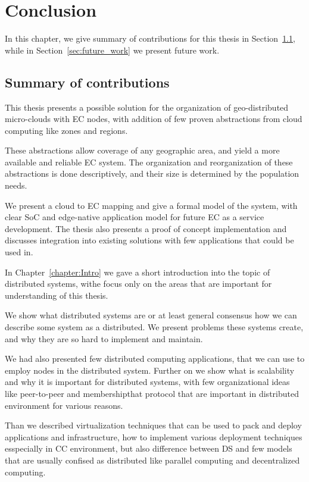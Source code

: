 \chapter{Conclusion}\label{chapter:Conclusion}
%
In this chapter, we give summary of contributions for this thesis in Section~\ref{sec:summary_of_contributions}, while in Section~\ref{sec:future_work} we present future work.
%
%
\section{Summary of contributions}\label{sec:summary_of_contributions}
%
This thesis presents a possible solution for the organization of geo-distributed micro-clouds with EC nodes, with addition of few proven abstractions from cloud computing like zones and regions. 

These abstractions allow coverage of any geographic area, and yield a more available and reliable EC system. The organization and reorganization of these abstractions is done descriptively, and their size is determined by the population needs. 

We present a cloud to EC mapping and give a formal model of the system, with clear SoC and edge-native application model for future EC as a service development. The thesis also presents a proof of concept implementation and discusses integration into existing solutions with few applications that could be used in.

In Chapter~\ref{chapter:Intro} we gave a short introduction into the topic of distributed systems,  withe focus only on the areas that are important for understanding of this thesis. 

We show what distributed systems are or at least general consensus how we can describe some system as a distributed. We present problems these systems create, and why they are so hard to implement and maintain. 

We had also presented few distributed computing applications, that we can use to employ nodes in the distributed system. Further on we show what is scalability and why it is important for distributed systems, with few organizational ideas like peer-to-peer and membershipthat protocol that are important in distributed environment for various reasons.

Than we described virtualization techniques that can be used to pack and deploy applications and infrastructure, how to implement various deployment techniques esspecially in CC environment, but also difference between DS and few models that are usually confised as distributed like parallel computing and decentralized computing.


